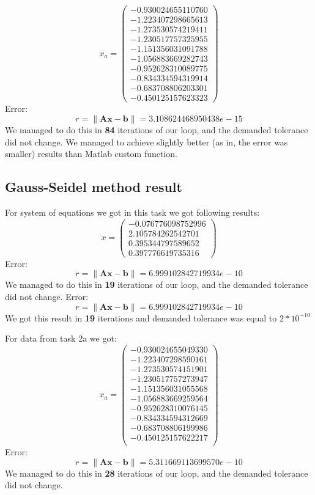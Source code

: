 \[ x_a = \left( \begin{array}{cc}
-0.930024655110760 \\
-1.223407298665613 \\
-1.273530574219411 \\
-1.230517757325955 \\
-1.151356031091788 \\
-1.056883669282743 \\
-0.952628310089775 \\
-0.834334594319914 \\
-0.683708806203301 \\
-0.450125157623323
\end{array} \right)
\]
Error:
\[ r = \| \mathbf{A}\mathbf{x} - \mathbf{b}\| = 3.108624468950438e-15 \]
We managed to do this in \textbf{84} iterations of our loop, and the demanded tolerance did not change.
We managed to achieve slightly better (as in, the error was smaller) results than Matlab custom function.

\newpage
\subsection{Gauss-Seidel method result}
For system of equations we got in this task we got following results:
\\
\[ x = \left( \begin{array}{cc}
  -0.076776098752996 \\
   2.105784262542701 \\
   0.395344797589652 \\
   0.397776619735316
\end{array} \right)
\]
Error:
\[ r = \| \mathbf{A}\mathbf{x} - \mathbf{b}\| = 6.999102842719934e-10 \]
We managed to do this in \textbf{19} iterations of our loop, and the demanded tolerance did not change.
Error:
\[ r = \| \mathbf{A}\mathbf{x} - \mathbf{b}\| = 6.999102842719934e-10 \]
We got this result in \textbf{19} iterations and demanded tolerance was equal to $2*10^{-10}$

For data from task 2a we got: \\
\[ x_a = \left( \begin{array}{cc}
-0.930024655049330 \\
-1.223407298590161 \\
-1.273530574151901 \\
-1.230517757273947 \\
-1.151356031055568 \\
-1.056883669259564 \\
-0.952628310076145 \\
-0.834334594312669 \\
-0.683708806199986 \\
-0.450125157622217 \\
\end{array} \right)
\]
Error:
\[ r = \| \mathbf{A}\mathbf{x} - \mathbf{b}\| = 5.311669113699570e-10 \]
We managed to do this in \textbf{28} iterations of our loop, and the demanded tolerance did not change.

